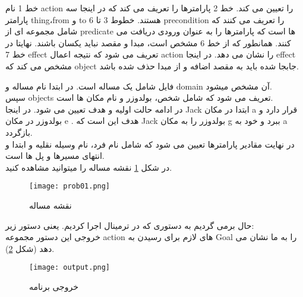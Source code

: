 \documentclass[12pt,onecolumn,a4paper]{article}
\begin{document}
	خط 1 نام action را تعیین می کند. خط 2 پارامترها را تعریف می کند که در اینجا سه پارامتر thing،from و to هستند.  خطوط 3 تا 6 precondition را تعریف می کنند که شامل مجموعه ای از  predicate ها است که پارامترها را به عنوان ورودی دریافت می کنند. همانطور که از خط 6 مشخص است، مبدا و مقصد نباید یکسان باشند. نهایتا در خط  7 effect تعریف می شود که نتیجه اعمال action را نشان می دهد. در اینجا effect مشخص می کند که object جابجا شده باید به مقصد اضافه و از مبدا حذف شده باشد.
	
	فایل   شامل یک مساله است. در ابتدا نام مساله و domain آن مشخص میشود.\\
 	سپس objects تعریف می شود که شامل شخص، بولدوزر و نام مکان ها است.\\ 
 	در ادامه حالت اولیه و هدف تعیین می شود. در اینجا Jack ابتدا در مکان a قرار دارد و بولدوزر در مکان e . هدف این است که Jack بولدوزر را به مکان g ببرد و خود به a بازگردد.\\
	در نهایت مقادیر پارامترها تعیین می شود که شامل نام فرد، نام وسیله نقلیه و ابتدا و انتهای مسیرها و پل ها است.\\
در شکل \ref{f1} نقشه مساله را میتوانید مشاهده کنید.
	\begin{figure}[!ht]
		\centering
		\texttt{[image: prob01.png]}
		\caption{نقشه مساله }
		\label{f1}
	\end{figure}

حال برمی گردیم به دستوری که در ترمینال اجرا کردیم. یعنی دستور زیر:\\
خروجی این دستور مجموعه action های لازم برای رسیدن به Goal را به ما نشان می دهد (شکل \ref{f2}). 
	\begin{figure}[!ht]
		\centering
		\texttt{[image: output.png]}
		\caption{خروجی برنامه}
		\label{f2}
	\end{figure}

		
	
\end{document}
